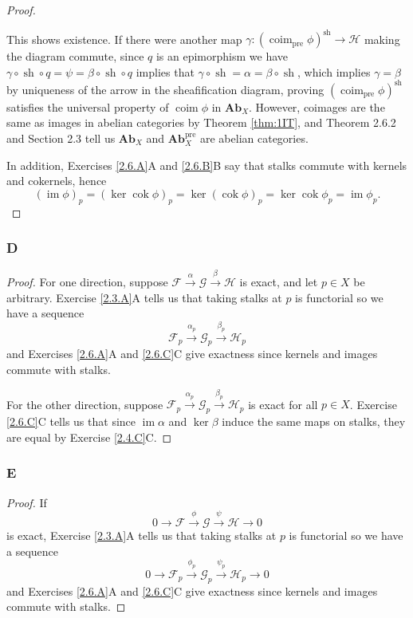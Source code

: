 \documentclass{article}
\newcommand{\fF}{\mathscr{F}}
\newcommand{\fG}{\mathscr{G}}
\newcommand{\fH}{\mathscr{H}}
\newcommand{\Ab}{\mathbf{Ab}} %
\DeclareMathOperator{\pre}{\mathrm{pre}}
\DeclareMathOperator{\im}{\mathrm{im}}
\DeclareMathOperator{\coim}{\mathrm{coim}}
\DeclareMathOperator{\cok}{\mathrm{cok}}
\DeclareMathOperator{\sh}{sh}
\begin{document}
\begin{proof}
\begin{center}
    \end{center}
    This shows existence. If there were another map $\gamma:(\coim_{\pre} \phi)^{\sh} \to \fH$ making the diagram commute, since $q$ is an epimorphism we have $\gamma \circ \sh \circ q = \psi = \beta \circ \sh \circ q$ implies that $\gamma \circ \sh =\alpha= \beta \circ \sh$, which implies $\gamma = \beta$ by uniqueness of the arrow in the sheafification diagram, proving $(\coim_{\pre} \phi)^{\sh}$ satisfies the universal property of $\coim \phi$ in $\Ab_X$. However, coimages are the same as images in abelian categories by Theorem \ref{thm:1IT}, and Theorem 2.6.2 and Section 2.3 tell us $\Ab_X$ and $\Ab_X^{\text{pre}}$ are abelian categories.

    In addition, Exercises \ref{2.6.A}A and \ref{2.6.B}B say that stalks commute with kernels and cokernels, hence
    \[
    (\im \phi)_p = (\ker \cok \phi)_p = \ker (\cok \phi)_p = \ker \cok \phi_p= \im \phi_p.
    \]
\end{proof}
\subsubsection{D} \label{2.6.D}
\begin{proof}
    For one direction, suppose $\fF \xrightarrow{\alpha} \fG \xrightarrow{\beta} \fH$ is exact, and let $p\in X$ be arbitrary. Exercise \ref{2.3.A}A tells us that taking stalks at $p$ is functorial so we have a sequence
    \[
    \fF_p \xrightarrow{\alpha_p} \fG_p \xrightarrow{\beta_p} \fH_p
    \]
    and Exercises \ref{2.6.A}A and \ref{2.6.C}C give exactness since kernels and images commute with stalks.
    
    For the other direction, suppose $\fF_p \xrightarrow{\alpha_p} \fG_p \xrightarrow{\beta_p} \fH_p$ is exact for all $p\in X$. Exercise \ref{2.6.C}C tells us that since $\im \alpha$ and $\ker \beta$ induce the same maps on stalks, they are equal by Exercise \ref{2.4.C}C.
\end{proof}
\subsubsection{E}\label{2.6.E}
\begin{proof}
    If 
    \[
    0\to \fF \xrightarrow{\phi} \fG \xrightarrow{\psi} \fH \to 0
    \]
    is exact, Exercise \ref{2.3.A}A tells us that taking stalks at $p$ is functorial so we have a sequence
    \[
    0\to \fF_p \xrightarrow{\phi_p} \fG_p \xrightarrow{\psi_p} \fH_p \to 0
    \]
    and Exercises \ref{2.6.A}A and \ref{2.6.C}C give exactness since kernels and images commute with stalks.
\end{proof}
\end{document}
